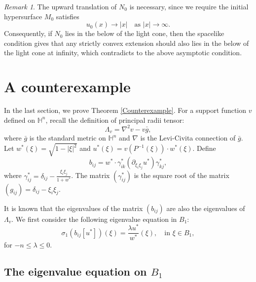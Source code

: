 \documentclass[reqno]{amsart}
\theoremstyle{remark}
\newtheorem{remark}[theorem]{Remark}
\renewcommand{\H}{{\mathbb{H}}}
\theoremstyle{definition}
\numberwithin{equation}{section}
\begin{document}
\begin{remark}
The upward translation of $N_0$ is necessary, since we require the initial hypersurface $M_0$ satisfies
\[
u_0(x) \rightarrow |x| \quad \text{as } |x| \rightarrow \infty.
\]
Consequently, if $N_0$ lies in the below of the light cone, then the spacelike condition gives that any strictly convex extension  should  also lies in the below of the light cone at infinity, which contradicts to the above asymptotic condition.    

\end{remark}


\section{A counterexample}

In the last section, we prove Theorem \ref{Counterexample}. For a support function \(v\) defined on  \(\H^n\), recall the definition of principal radii tensor:  
\[ \Lambda_v = \nabla^2 v - v\bar{g}, \]
where \(\bar{g}\) is the standard metric on \(\H^n\) and \(\nabla\) is the Levi-Civita connection of \(\bar{g}\). 
Let \(w^*(\xi) = \sqrt{1-|\xi|^2}\) and \(u^*(\xi) = v(P^{-1}(\xi))\cdot w^*(\xi)\). Define 
\[ b_{ij} = w^*\cdot \gamma^*_{ik}(\partial_{\xi_i \xi_j}u^*) \gamma^*_{kj}, \]
where \(\gamma^*_{ij} = \delta_{ij} - \frac{\xi_i\xi_j}{1+w^*}\). The matrix \((\gamma^*_{ij})\) is the square root of the matrix \((g_{ij}) = \delta_{ij} - \xi_i \xi_j\). 
\par It is known that the eigenvalues of the matrix \((b_{ij})\) are also the eigenvalues of $\Lambda_v$. We first consider the following eigenvalue equation in \(B_1\): 
\begin{equation}\label{eigenequ}
    \sigma_1(b_{ij}[u^*])(\xi) = \frac{\lambda u^*}{w^*}(\xi), \quad \text{in }\xi\in B_1,
\end{equation}
for \(-n \leqslant \lambda \leqslant 0\).


\subsection{The eigenvalue equation on \texorpdfstring{\(B_1\)}{B1}}\label{The eigenvalue equation on B1}
\end{document}
